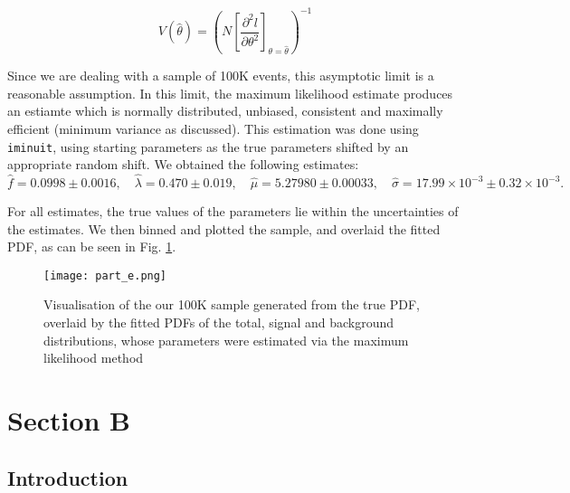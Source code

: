 \documentclass{article}
\begin{document}
\begin{equation}
V(\hat{\theta}) = \left(N\left[\frac{{\partial^2}l}{{\partial\theta^2}}\right]_{\theta=\hat{\theta}} \right)^{-1}
\label{eq:minvar}
\end{equation}

Since we are dealing with a sample of 100K events, this asymptotic limit is a reasonable assumption. In this limit, the maximum likelihood estimate produces an estiamte which is normally distributed, unbiased, consistent and maximally efficient (minimum variance as discussed). This estimation was done using \texttt{iminuit}, using starting parameters as the true parameters shifted by an appropriate random shift. We obtained the following estimates:
\[ \hat{f} = 0.0998 \pm 0.0016, \quad \hat{\lambda} = 0.470 \pm 0.019, \quad \hat{\mu} = 5.27980 \pm 0.00033, \quad \hat{\sigma} = 17.99 \times 10^{-3} \pm 0.32 \times 10^{-3}. \]

For all estimates, the true values of the parameters lie within the uncertainties of the estimates. We then binned and plotted the sample, and overlaid the fitted PDF, as can be seen in Fig. \ref{fig:e}.

\begin{figure}[h]
\centering
\texttt{[image: part\_e.png]}
\caption{Visualisation of the our 100K sample generated from the true PDF, overlaid by the fitted PDFs of the total, signal and background distributions, whose parameters were estimated via the maximum likelihood method}
\label{fig:e}
\end{figure}


\section*{Section B}

\subsection*{Introduction}
\end{document}
